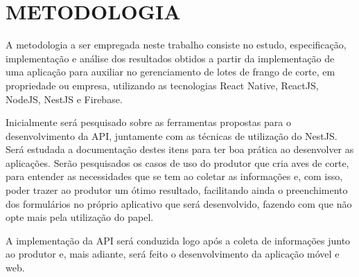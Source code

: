 
\chapter{METODOLOGIA}
\label{chap:metodologia}

A metodologia a ser empregada neste trabalho consiste no estudo, especificação, implementação e análise dos resultados obtidos a partir da implementação de uma aplicação para auxiliar no gerenciamento de lotes  de frango de corte, em propriedade ou empresa, utilizando as tecnologias React Native, ReactJS, NodeJS, NestJS e Firebase.


Inicialmente será pesquisado sobre as ferramentas propostas para o desenvolvimento da API, juntamente com as técnicas de utilização do NestJS. Será estudada a documentação destes itens para ter boa prática ao desenvolver as aplicações. Serão pesquisados os casos de uso do produtor que cria aves de corte, para entender as necessidades que se tem ao coletar as informações e, com isso, poder trazer ao produtor um ótimo resultado, facilitando ainda o preenchimento dos formulários no próprio aplicativo que será desenvolvido, fazendo com que não opte mais pela utilização do papel. 

A implementação da API será conduzida logo após a coleta de informações junto ao produtor e, mais adiante, será feito o desenvolvimento da aplicação móvel e web.
